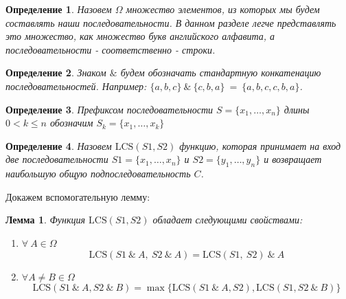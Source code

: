 \documentclass[12pt]{article}
\newtheorem{lemma}{Лемма}
\newtheorem{definition}{Определение}
\def\LCS{
    \mathrm{LCS}
}
\begin{document}
\begin{definition}
    Назовем $\Omega$ множество элементов,
    из которых мы будем составлять наши последовательности.
    В данном разделе легче представлять это множество, как множество
    букв английского алфавита, а последовательности - соответственно - строки.
\end{definition}
\begin{definition}
    Знаком $\&$ будем обозначать стандартную конкатенацию последовательностей.
    Например: $\{a,b,c\}\ \&\ \{c,b,a\}\ =\ \{a,b,c,c,b,a\}$.
\end{definition}
\begin{definition}
    Префиксом последовательности $S=\{x_1,\ldots,x_n\}$ длины $0 < k\leq n$
    обозначим $S_k=\{x_1,\ldots, x_k\}$
\end{definition}
\begin{definition}
    Назовем $\LCS(S1, S2)$ функцию, которая принимает на вход
    две последовательности $S1 = \{x_1, \ldots, x_n\}$ и $S2 = \{y_1, \ldots, y_n\}$ и возвращает
    наибольшую общую подпоследовательность $C$.
\end{definition}
    Докажем вспомогательную лемму:
\begin{lemma} \label{lm::props}
    Функция $\LCS(S1, S2)$ обладает следующими свойствами:
    \begin{enumerate}
        \item $\forall\ A\in\Omega$
            $$\LCS(S1\ \&\ A,\ S2\ \&\ A) = \LCS(S1,\ S2)\ \&\ A$$
        \item $\forall A\neq B\in\Omega$
            $$\LCS(S1\ \&\ A, S2\ \&\ B) = \max \{\LCS(S1\ \&\ A, S2), \LCS(S1, S2\ \&\ B)\}$$
    \end{enumerate}
\end{lemma}
\end{document}
